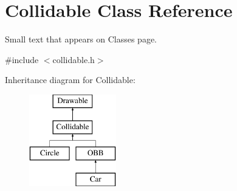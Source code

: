 \hypertarget{class_collidable}{}\section{Collidable Class Reference}
\label{class_collidable}


Small text that appears on Classes page.  




{\ttfamily \#include $<$collidable.\+h$>$}

Inheritance diagram for Collidable\+:\begin{figure}[H]
\begin{center}
\leavevmode
\includegraphics[height=4.000000cm]{class_collidable}
\end{center}
\end{figure}
